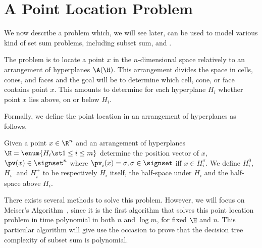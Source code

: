 \section{A Point Location Problem}

We now describe a problem which, we will see later, can be used to model
various kind of set sum problems, including subset sum, \kSUM and \kLDT.

The problem is to locate a point $x$ in the $n$-dimensional space relatively
to an arrangement of hyperplanes $\A(\H)$. This arrangement divides the space
in cells, cones, and faces and the goal will be to determine which
cell, cone, or face contains point $x$. This amounts to determine for each
hyperplane $H_i$ whether point $x$ lies above, on or below $H_i$.

Formally, we define the point location in an arrangement of hyperplanes as
follows,

\begin{problem}
Given a point $x \in \R^n$ and an arrangement of hyperplanes $\H = \enum{ H_i
\st 1 \leq i \leq m }$ determine the position vector of $x$, $\pv(x) \in
\signset^n$ where $\pv_i(x) = \sigma, \sigma \in \signset$ iff $x \in
H_i^{\sigma}$. We define $H_i^{0}$, $H_i^{-}$ and $H_i^{+}$ to be
respectively $H_i$ itself, the half-space under $H_i$ and the half-space above
$H_i$.
\end{problem}

There exists several methods to solve this problem. However, we will focus on
Meiser's Algorithm~\cite{meiser:1993}, since it is the first algorithm that
solves this point location problem in time polynomial in both $n$ and $\log
m$, for fixed $\H$ and $n$. This particular algorithm will give use the
occasion to prove that the decision tree complexity of subset sum is
polynomial.
